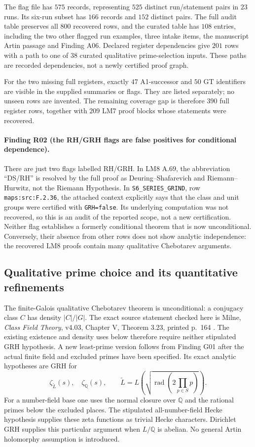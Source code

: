 \documentclass[11pt,a4paper]{article}
\begin{document}
The flag file has $575$ records, representing $525$ distinct run/statement
pairs in $23$ runs. Its six-run subset has $166$ records and $152$
distinct pairs. The full audit table preserves all $800$ recovered rows,
and the curated table has $108$ entries, including the two other flagged
run examples, three intake items, the manuscript Artin passage and
Finding A06. Declared register dependencies give $201$ rows with a path
to one of $38$ curated qualitative prime-selection inputs. These paths
are recorded dependencies, not a newly certified proof graph.

For the two missing full registers, exactly $47$ A1-successor and $50$
GT identifiers are visible in the supplied summaries or flags. They
are listed separately; no unseen rows are invented. The remaining
coverage gap is therefore $390$ full register rows, together with $209$
LM7 proof blocks whose statements were recovered.

\paragraph{Finding R02 (the RH/GRH flags are false positives for conditional dependence).}
There are just two flags labelled RH/GRH. In LM8 A.69, the abbreviation
``DS/RH'' is resolved by the full proof as Deuring--Shafarevich and
Riemann--Hurwitz, not the Riemann Hypothesis. In
\texttt{S6\_SERIES\_GRIND}, row \texttt{maps:src:F.2.36}, the attached
context explicitly says that the class and unit groups were certified
with \texttt{GRH=false}. Its underlying computation was not recovered,
so this is an audit of the reported scope, not a new certification.
Neither flag establishes a formerly conditional theorem that is now
unconditional. Conversely, their absence from other rows does not show
analytic independence: the recovered LM8 proofs contain many
qualitative Chebotarev arguments.

\subsection{Qualitative prime choice and its quantitative refinements}

The finite-Galois qualitative Chebotarev theorem is unconditional:
a conjugacy class $C$ has density $|C|/|G|$. The exact source statement
checked here is Milne, \emph{Class Field Theory}, v4.03,
Chapter V, Theorem 3.23, printed p.~164 \cite{MilneCFT}.
The existing existence and density uses below therefore require neither
stipulated GRH hypothesis. A new least-prime version follows from
Finding G01 after the actual finite field and excluded primes have
been specified. Its exact analytic hypotheses are GRH for
\[
 \zeta_{\widetilde L}(s),\quad\zeta_{\mathbb Q}(s),\qquad
 \widetilde L=L\!\left(\sqrt{\operatorname{rad}
                     (2\prod_{p\in S}p)}\right).
\]
For a number-field base one uses the normal closure over $\mathbb Q$
and the rational primes below the excluded places. The stipulated
all-number-field Hecke hypothesis supplies these zeta functions as
trivial Hecke characters. Dirichlet GRH supplies this particular
argument when $L/\mathbb Q$ is abelian. No general Artin holomorphy
assumption is introduced.
\end{document}
